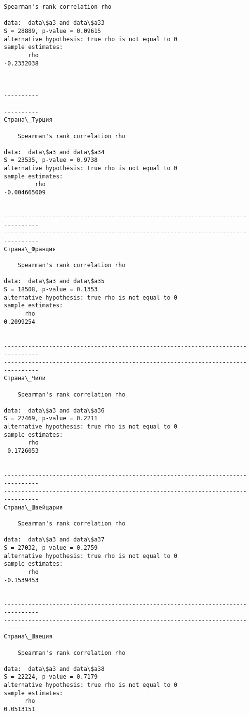 \documentclass[11pt,mathletters]{article}
\begin{document}
\begin{Verbatim}[commandchars=\\\{\}]
	Spearman's rank correlation rho

data:  data\$a3 and data\$a33
S = 28889, p-value = 0.09615
alternative hypothesis: true rho is not equal to 0
sample estimates:
       rho 
-0.2332038 


--------------------------------------------------------------------------------
--------------------------------------------------------------------------------
Страна\_Турция

	Spearman's rank correlation rho

data:  data\$a3 and data\$a34
S = 23535, p-value = 0.9738
alternative hypothesis: true rho is not equal to 0
sample estimates:
         rho 
-0.004665009 


--------------------------------------------------------------------------------
--------------------------------------------------------------------------------
Страна\_Франция

	Spearman's rank correlation rho

data:  data\$a3 and data\$a35
S = 18508, p-value = 0.1353
alternative hypothesis: true rho is not equal to 0
sample estimates:
      rho 
0.2099254 


--------------------------------------------------------------------------------
--------------------------------------------------------------------------------
Страна\_Чили

	Spearman's rank correlation rho

data:  data\$a3 and data\$a36
S = 27469, p-value = 0.2211
alternative hypothesis: true rho is not equal to 0
sample estimates:
       rho 
-0.1726053 


--------------------------------------------------------------------------------
--------------------------------------------------------------------------------
Страна\_Швейцария

	Spearman's rank correlation rho

data:  data\$a3 and data\$a37
S = 27032, p-value = 0.2759
alternative hypothesis: true rho is not equal to 0
sample estimates:
       rho 
-0.1539453 


--------------------------------------------------------------------------------
--------------------------------------------------------------------------------
Страна\_Швеция

	Spearman's rank correlation rho

data:  data\$a3 and data\$a38
S = 22224, p-value = 0.7179
alternative hypothesis: true rho is not equal to 0
sample estimates:
      rho 
0.0513151 



\end{Verbatim}
\end{document}
